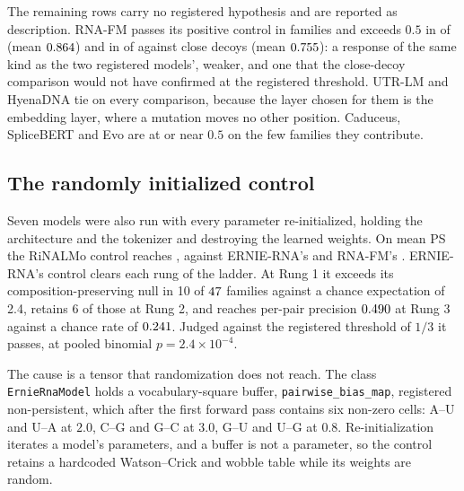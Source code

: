 \documentclass[11pt]{article}
\begin{document}
The remaining rows carry no registered hypothesis and are reported as
description. RNA-FM passes its positive control in
\decoyPopulationRNAFM{} families and exceeds $0.5$ in \decoyAllAboveRNAFM{} of
\decoyAllFamiliesRNAFM{} (mean $0.864{}$) and in
\decoyCloseAboveRNAFM{} of \decoyCloseFamiliesRNAFM{} against close decoys
(mean $0.755{}$): a response of the same kind as the two
registered models', weaker, and one that the close-decoy comparison would not
have confirmed at the registered threshold. UTR-LM and HyenaDNA tie on every
comparison, because the layer chosen for them is the embedding layer, where a
mutation moves no other position. Caduceus, SpliceBERT and Evo are at or near
$0.5$ on the few families they contribute.

\subsection{The randomly initialized control}
\label{sec:random-init}

Seven models were also run with every parameter re-initialized, holding the
architecture and the tokenizer and destroying the learned weights. On mean PS
the RiNALMo control reaches \psUntrainedRiNALMo{}, against ERNIE-RNA's
\psUntrainedErnieRNA{} and RNA-FM's \psUntrainedRNAFM{}. ERNIE-RNA's
control clears each rung of the ladder. At Rung 1 it exceeds its
composition-preserving null in 10 of $47{}$ families against a chance
expectation of 2.4, retains 6 of those at Rung 2, and reaches per-pair precision
$0.490{}$ at Rung 3 against a chance rate of
$0.241{}$. Judged against the
registered threshold of $1/3$ it passes, at pooled binomial $p = 2.4 \times
10^{-4}$.

The cause is a tensor that randomization does not reach. The class
\texttt{ErnieRnaModel} holds a vocabulary-square buffer,
\texttt{pairwise\_bias\_map}, registered non-persistent, which after the first
forward pass contains six non-zero cells: A--U and U--A at $2.0$, C--G and G--C
at $3.0$, G--U and U--G at $0.8$. Re-initialization iterates a model's
parameters, and a buffer is not a parameter, so the control retains a hardcoded
Watson--Crick and wobble table while its weights are random.


\end{document}
